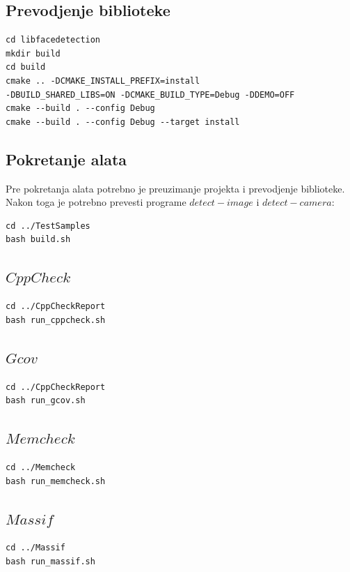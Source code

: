 \documentclass{article}
\begin{document}
\subsection*{Prevodjenje biblioteke}

\begin{verbatim}
cd libfacedetection
mkdir build
cd build
cmake .. -DCMAKE_INSTALL_PREFIX=install 
-DBUILD_SHARED_LIBS=ON -DCMAKE_BUILD_TYPE=Debug -DDEMO=OFF
cmake --build . --config Debug
cmake --build . --config Debug --target install
\end{verbatim}

\subsection{Pokretanje alata}
\selectfont
Pre pokretanja alata potrebno je preuzimanje projekta i prevodjenje biblioteke. \\
Nakon toga je potrebno prevesti programe $detect-image$ i $detect-camera$:
\selectfont
\begin{verbatim}
cd ../TestSamples
bash build.sh
\end{verbatim}

\subsection*{$CppCheck$}
\begin{verbatim}
cd ../CppCheckReport
bash run_cppcheck.sh
\end{verbatim}

\subsection*{$Gcov$}
\begin{verbatim}
cd ../CppCheckReport
bash run_gcov.sh
\end{verbatim}

\subsection*{$Memcheck$}
\begin{verbatim}
cd ../Memcheck
bash run_memcheck.sh
\end{verbatim}
\subsection*{$Massif$}
\begin{verbatim}
cd ../Massif
bash run_massif.sh
\end{verbatim}
\newpage
{}\selectfont


\selectfont

\end{document}

